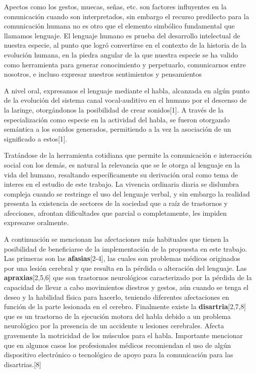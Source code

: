 \hfill \break
\justifying
Apectos como los gestos, muecas, señas, etc. son factores influyentes en la comunicación cuando son interpretados, sin embargo el recurso predilecto para la comunicación humana no es otro que el elemento simbólico fundamental que llamamos lenguaje. El lenguaje humano es prueba del desarrollo intelectual de nuestra especie, al punto que logró convertirse en el contexto de la historia de la evolución humana, en la piedra angular de la que nuestra especie se ha valido como herramienta para generar conocimiento y perpetuarlo, comunicarnos entre nosotros, e incluso expresar nuestros sentimientos y pensamientos

\hfill \break
\justifying
A nivel oral, expresamos el lenguaje mediante el habla, alcanzada en algún punto de la evolución del sistema canal vocal-auditivo en el humano por el descenso de la laringe, otorgándonos la posibilidad de crear sonidos[1]. A través de la especialización como especie en la actividad del habla, se fueron otorgando semántica a los sonidos generados, permitiendo a la vez la asociación de un significado a estos[1].

\hfill \break
\justifying
Tratándose de la herramienta cotidiana que permite la comunicación e interacción social con los demás, es natural la relevancia que se le otorga al lenguaje en la vida del humano, resaltando específicamente su derivación oral como tema de interes en el estudio de este trabajo. La vivencia ordinaria diaria se dislumbra compleja cuando se restringe el uso del lenguaje verbal, y sin embargo la realidad presenta la existencia de sectores de la sociedad que a raíz de trastornos y afecciones, afrontan dificultades que parcial o completamente, les impiden expresarse oralmente.

\hfill \break
\justifying
A continuación se mencionan las afectaciones más habituales que tienen la posibilidad de beneficiarse de la implementación de la propuesta en este trabajo. Las primeras son las \textbf{afasias}[2-4], las cuales son problemas médicos originados por una lesión cerebral y que resulta en la pérdida o alteración del lenguaje.  Las \textbf{apraxias}[2,5,6] que son trastornos neurológicos caracterizado por la pérdida de la capacidad de llevar a cabo movimientos diestros y gestos, aún cuando se tenga el deseo y la habilidad física para hacerlo, teniendo diferentes afectaciones en función de la parte lesionada en el cerebro. Finalmente existe la \textbf{disartria}[2,7,8] que es un trastorno de la ejecución motora del habla debido a un problema neurológico por la presencia de un accidente u lesiones cerebrales. Afecta gravemente la motricidad de los músculos para el habla. Importante mencionar que en algunos casos los profesionales médicos recomiendan el uso de algún dispositivo electrónico o tecnológico de apoyo para la comunicación para las disartrias.[8]

